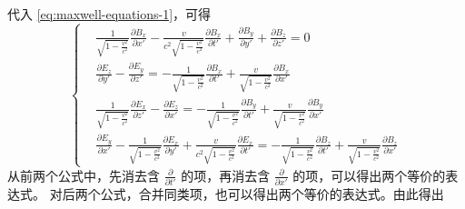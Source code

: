 代入 \cref{eq:maxwell-equations-1}，可得
\begin{equation}
    \left\{
    \begin{aligned}
         & \frac{1}{\sqrt{1 - \frac{v^2}{c^2}}} \frac{\partial B_x}{\partial x'} - \frac{v}{c^2 \sqrt{1 - \frac{v^2}{c^2}}} \frac{\partial B_x}{\partial t'} + \frac{\partial B_y}{\partial y'} + \frac{\partial B_z}{\partial z'} = 0                                                                                                            \\
         & \frac{\partial E_z}{\partial y'} - \frac{\partial E_y}{\partial z'} = - \frac{1}{\sqrt{1 - \frac{v^2}{c^2}}} \frac{\partial B_x}{\partial t'} + \frac{v}{\sqrt{1 - \frac{v^2}{c^2}}} \frac{\partial B_x}{\partial x'}                                                                                                                  \\
         & \frac{1}{\sqrt{1 - \frac{v^2}{c^2}}} \frac{\partial E_x}{\partial z'} - \frac{\partial E_z}{\partial x'} = - \frac{1}{\sqrt{1 - \frac{v^2}{c^2}}} \frac{\partial B_y}{\partial t'} + \frac{v}{\sqrt{1 - \frac{v^2}{c^2}}} \frac{\partial B_y}{\partial x'}                                                                             \\
         & \frac{\partial E_y}{\partial x'} - \frac{1}{\sqrt{1 - \frac{v^2}{c^2}}} \frac{\partial E_x}{\partial y'} + \frac{v}{c^2 \sqrt{1 - \frac{v^2}{c^2}}} \frac{\partial E_x}{\partial t'} = - \frac{1}{\sqrt{1 - \frac{v^2}{c^2}}} \frac{\partial B_z}{\partial t'} + \frac{v}{\sqrt{1 - \frac{v^2}{c^2}}} \frac{\partial B_z}{\partial x'}
    \end{aligned}
    \right.
\end{equation}
从前两个公式中，先消去含 $\frac{\partial}{\partial t'}$ 的项，再消去含 $\frac{\partial}{\partial x'}$ 的项，可以得出两个等价的表达式。
对后两个公式，合并同类项，也可以得出两个等价的表达式。由此得出
